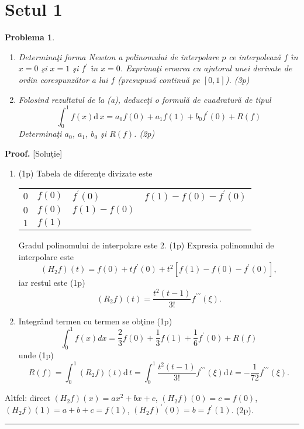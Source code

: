 \documentclass{article}%
\newtheorem{problem}[theorem]{Problema}
\newenvironment{proof}[1][Proof]{\noindent\textbf{#1.} }{\ \rule{0.5em}{0.5em}}
\begin{document}
\section*{Setul 1}

\begin{problem}
\label{pb4.3}

\begin{enumerate}
\item[(a)] Determina\c{t}i forma Newton a polinomului de interpolare $p$ ce
interpoleaz\u{a} $f$ \^{\i}n $x=0$ \c{s}i $x=1$ \c{s}i $f^{\prime}$ \^{\i}n
$x=0$. Exprima\c{t}i eroarea cu ajutorul unei derivate de ordin
corespunz\u{a}tor a lui $f$ (presupus\u{a} continu\u{a} pe $[0,1]$). (3p)

\item[(b)] Folosind rezultatul de la (a), deduce\c{t}i o formul\u{a} de
cuadratur\u{a} de tipul
\[
\int_{0}^{1}f(x)\mathrm{d}\,x=a_{0}f(0)+a_{1}f(1)+b_{0}f^{\prime}(0)+R(f)
\]
Determina\c{t}i $a_{0}$, $a_{1}$, $b_{0}$ \c{s}i $R(f)$. (2p)
\end{enumerate}
\end{problem}

\begin{proof}
[Solu\c{t}ie]

\begin{enumerate}
\item[(a)] (1p) Tabela de diferen\c{t}e divizate este%

\begin{tabular}
[c]{llll}%
$0$ & $f(0)$ & $f^{\prime}(0)$ & $f(1)-f(0)-f^{\prime}(0)$\\
$0$ & $f(0)$ & $f(1)-f(0)$ & \\
$1$ & $f(1)$ &  &
\end{tabular}


Gradul polinomului de interpolare este 2. (1p) Expresia polinomului de
interpolare este%
\[
(H_{2}f)(t)=f(0)+tf^{\prime}(0)+t^{2}\left[  f(1)-f(0)-f^{\prime}(0)\right]
,
\]
iar restul este (1p)%
\[
(R_{2}f)(t)=\frac{t^{2}(t-1)}{3!}f^{\prime\prime\prime}(\xi).
\]


\item[(b)] Integr\^{a}nd termen cu termen se ob\c{t}ine (1p)%
\[
\int_{0}^{1}f(x)dx=\frac{2}{3}f(0)+\frac{1}{3}f(1)+\frac{1}{6}f^{\prime
}(0)+R(f)
\]
unde (1p)%
\[
R(f)=\int_{0}^{1}(R_{2}f)(t)\mathrm{d}\,t=\int_{0}^{1}\frac{t^{2}(t-1)}%
{3!}f^{\prime\prime\prime}(\xi)\mathrm{d}\,t=-\frac{1}{72}f^{\prime
\prime\prime}(\xi).
\]

\end{enumerate}

Altfel: direct $\left(  H_{2}f\right)  (x)=ax^{2}+bx+c$, $(H_{2}f)(0)=c=f(0)$,
$(H_{2}f)(1)=a+b+c=f(1)$, $(H_{2}f)^{\prime}(0)=b=f^{\prime}(1)$. (2p).
\end{proof}
\end{document}
